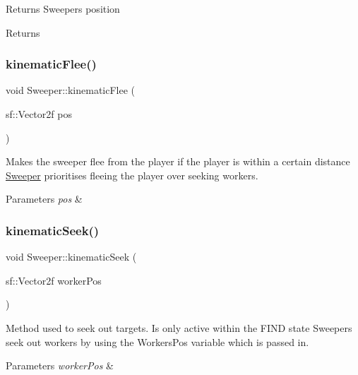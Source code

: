 Returns Sweepers position 

\begin{DoxyReturn}{Returns}

\end{DoxyReturn}
\mbox{\label{class_sweeper_ae240040aec3dd3f3c0082e5c614fab6d}} 
\subsubsection{\texorpdfstring{kinematicFlee()}{kinematicFlee()}}
{\footnotesize\ttfamily void Sweeper\+::kinematic\+Flee (\begin{DoxyParamCaption}\item[{sf\+::\+Vector2f}]{pos }\end{DoxyParamCaption})}



Makes the sweeper flee from the player if the player is within a certain distance \mbox{\hyperlink{class_sweeper}{Sweeper}} prioritises fleeing the player over seeking workers. 


\begin{DoxyParams}{Parameters}
{\em pos} & \\
\hline
\end{DoxyParams}
\mbox{\label{class_sweeper_a635c38dff02c5dcc73248b3359fdaee3}} 
\subsubsection{\texorpdfstring{kinematicSeek()}{kinematicSeek()}}
{\footnotesize\ttfamily void Sweeper\+::kinematic\+Seek (\begin{DoxyParamCaption}\item[{sf\+::\+Vector2f}]{worker\+Pos }\end{DoxyParamCaption})}



Method used to seek out targets. Is only active within the F\+I\+ND state Sweepers seek out workers by using the Workers\+Pos variable which is passed in. 


\begin{DoxyParams}{Parameters}
{\em worker\+Pos} & \\
\hline
\end{DoxyParams}
\mbox{\label{class_sweeper_a8308b5cec3c19e0292947081100d777b}} 
